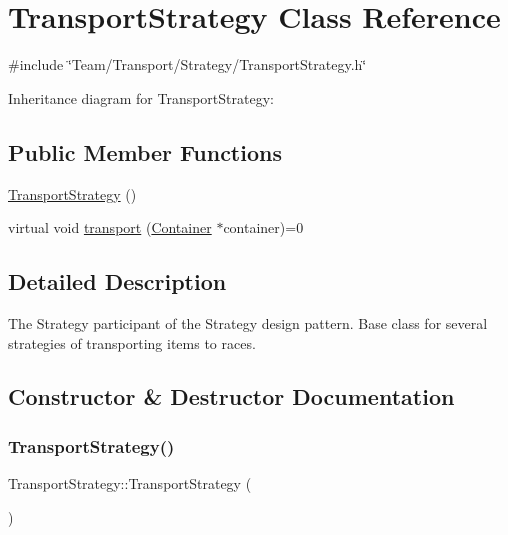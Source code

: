 \hypertarget{classTransportStrategy}{}\section{Transport\+Strategy Class Reference}
\label{classTransportStrategy}


{\ttfamily \#include \char`\"{}Team/\+Transport/\+Strategy/\+Transport\+Strategy.\+h\char`\"{}}



Inheritance diagram for Transport\+Strategy\+:
\subsection*{Public Member Functions}
\begin{DoxyCompactItemize}
\item 
\hyperlink{classTransportStrategy_a671ad3b1ff9163b4c18bddae2484a6d1}{Transport\+Strategy} ()
\item 
virtual void \hyperlink{classTransportStrategy_ab5659f9d5d352ba0a23f1e99edd3d488}{transport} (\hyperlink{classContainer}{Container} $\ast$container)=0
\end{DoxyCompactItemize}


\subsection{Detailed Description}
The Strategy participant of the Strategy design pattern. Base class for several strategies of transporting items to races. 

\subsection{Constructor \& Destructor Documentation}
\mbox{\label{classTransportStrategy_a671ad3b1ff9163b4c18bddae2484a6d1}} 
\subsubsection{\texorpdfstring{Transport\+Strategy()}{TransportStrategy()}}
{\footnotesize\ttfamily Transport\+Strategy\+::\+Transport\+Strategy (\begin{DoxyParamCaption}{ }\end{DoxyParamCaption})}


